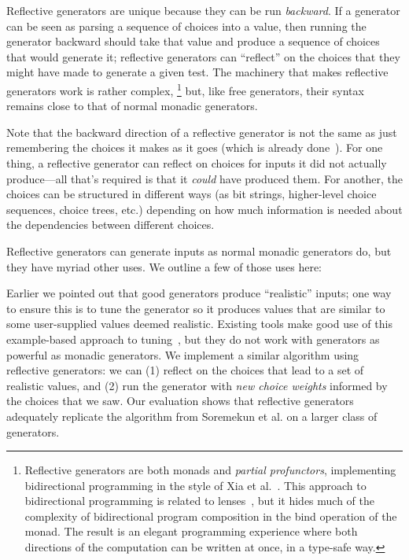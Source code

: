 Reflective generators are unique because they can be run {\em backward}.
If a generator can be seen as parsing a sequence of choices into a
value, then running the
generator backward should take that value and produce a sequence of choices that
would generate it; reflective generators can
``reflect'' on the choices that they might have made to generate a
given test. The machinery
that makes reflective generators work is rather complex,%
\footnote{\normalsize Reflective generators are both monads and {\em
    partial profunctors},
implementing bidirectional programming in the style of Xia et
al.~\cite{xia2019composing}. This approach to bidirectional programming is
related to lenses~\cite{foster2009bidirectional}, but it hides much of the
complexity of bidirectional program composition in the bind operation of the
monad. The result is an elegant programming experience where both directions of
the computation can be written at once, in a type-safe way.}
but, like free generators, their syntax remains close to that of normal
monadic generators.

Note that the backward direction of a reflective generator is not the
same as just remembering the choices it makes as it goes (which is
already done~\cite{maciver2019hypothesis,
  hatfield-dodds_hypofuzz_nodate}). For one thing, a reflective
generator can reflect on choices for inputs it did not actually
produce---all that's required is that it {\em could} have produced
them.  For another, the choices can be structured in different ways (as bit
strings, higher-level choice sequences, choice trees, etc.) depending
on how much information is needed about the dependencies between different
choices.

Reflective generators can generate inputs as normal monadic generators do,
but they have myriad other uses. We outline a few of those uses here:

 Earlier we pointed out that good generators
produce ``realistic'' inputs; one way to ensure this is to tune the generator so
it produces values that are similar to some user-supplied values deemed
realistic. Existing tools make good use of this example-based approach to
tuning~\cite{soremekun2020inputs}, but they do not work with generators as
powerful as monadic generators. We implement a similar algorithm using
reflective generators: we can (1) reflect on the choices that lead to a
set of realistic values, and (2) run the generator with {\em new choice weights}
informed by the choices that we saw. Our evaluation shows that reflective
generators adequately replicate the algorithm from
Soremekun et al. on a larger class of generators.

